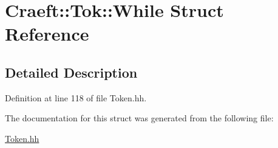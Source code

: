 \hypertarget{struct_craeft_1_1_tok_1_1_while}{}\section{Craeft\+:\+:Tok\+:\+:While Struct Reference}
\label{struct_craeft_1_1_tok_1_1_while}


\subsection{Detailed Description}


Definition at line 118 of file Token.\+hh.



The documentation for this struct was generated from the following file\+:\begin{DoxyCompactItemize}
\item 
\hyperlink{_token_8hh}{Token.\+hh}\end{DoxyCompactItemize}
